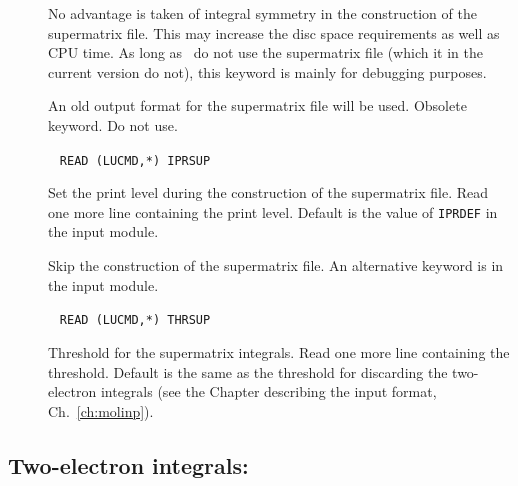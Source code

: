\begin{description}
\item[] No advantage is taken of integral symmetry in the
construction of the supermatrix file. This may increase the disc space
requirements as well as  CPU time. As long as \aba\ do not use the
supermatrix file (which it in the current version do not), this
keyword is mainly for debugging purposes.

\item[] An old output format for the supermatrix file
will be used. Obsolete keyword. Do not use.

\item[]\verb| |\newline
\verb|READ (LUCMD,*) IPRSUP|

Set the print level during the construction of the supermatrix file.
Read one more line containing the print level. Default is the
value of \verb|IPRDEF| in the  input module.

\item[] Skip the construction of the supermatrix file.
An alternative keyword is  in the  input
module.

\item[]\verb| |\newline
\verb|READ (LUCMD,*) THRSUP|

Threshold for the supermatrix integrals. Read one more line containing
the threshold. Default is the same as the threshold for
discarding the two-electron integrals (see the Chapter describing the
\mol input format, Ch.~\ref{ch:molinp}).
\end{description}

\subsection{Two-electron integrals: }


